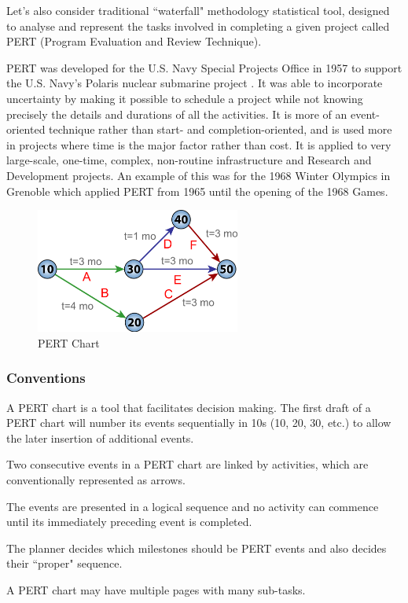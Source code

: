 
Let's also consider traditional ``waterfall" methodology  statistical tool, designed to analyse and represent the tasks involved in completing a given project called PERT (Program Evaluation and Review Technique).

PERT was developed for the U.S. Navy Special Projects Office in 1957 to support the U.S. Navy's Polaris nuclear submarine project \cite{fazar}. It was able to incorporate uncertainty by making it possible to schedule a project while not knowing precisely the details and durations of all the activities. It is more of an event-oriented technique rather than start- and completion-oriented, and is used more in projects where time is the major factor rather than cost. It is applied to very large-scale, one-time, complex, non-routine infrastructure and Research and Development projects. An example of this was for the 1968 Winter Olympics in Grenoble which applied PERT from 1965 until the opening of the 1968 Games.


\begin{figure}
	\centering
	\includegraphics[width=0.6\textwidth]{resources/pert.png}
	\caption[PERT Chart]{PERT Chart}
\end{figure}

\subsubsection{Conventions}

\begin{compactitem}
\item A PERT chart is a tool that facilitates decision making. The first draft of a PERT chart will number its events sequentially in 10s (10, 20, 30, etc.) to allow the later insertion of additional events.
\item Two consecutive events in a PERT chart are linked by activities, which are conventionally represented as arrows.
\item The events are presented in a logical sequence and no activity can commence until its immediately preceding event is completed.
\item The planner decides which milestones should be PERT events and also decides their ``proper" sequence.
\item A PERT chart may have multiple pages with many sub-tasks.
\end{compactitem}


